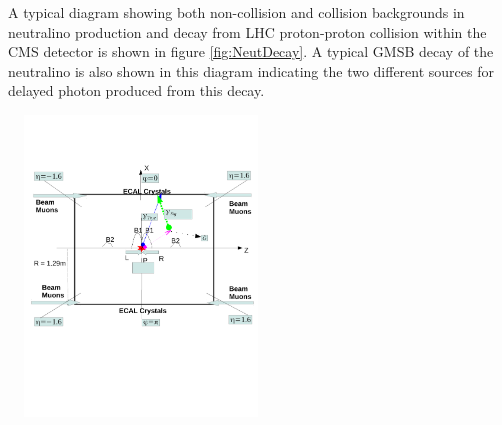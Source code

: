 A typical diagram showing both non-collision and collision backgrounds in neutralino production and decay from LHC proton-proton collision within the CMS detector is shown in figure \ref{fig:NeutDecay}. A typical GMSB decay of the neutralino is also shown in this diagram indicating the two different sources for delayed photon produced from this decay.
\begin{center}
\centering
\mbox{
\includegraphics[height=8cm, width=0.5\textwidth]{THESISPLOTS/Background_Delayed_Photon.pdf}
}
\label{fig:NeutDecay}
\end{center}

